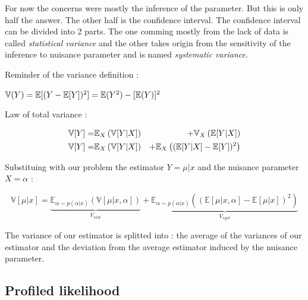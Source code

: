 For now the concerns were mostly the inference of the parameter.
But this is only half the answer.
The other half is the confidence interval.
The confidence interval can be divided into 2 parts.
The one comming mostly from the lack of data is called \emph{statistical variance} and the other takes origin from the sensitivity of the inference to nuisance parameter and is named \emph{systematic variance}.

Reminder of the variance definition :

$\mathbb{V}(Y) = \mathbb{E}[(Y - \mathbb{E}[Y])^2] = \mathbb{E}(Y^2) - [\mathbb{E}(Y)]^2$

Law of total variance \needcite :

\begin{eqnarray}
\label{eq:total_variance_law}
    \mathbb{V}[Y] =& \mathbb{E}_X \left (\mathbb{V}[Y|X] \right ) &+ \mathbb{V}_X \left (\mathbb{E}[Y|X]\right ) \\
    \mathbb{V}[Y] =& \mathbb{E}_X \left (\mathbb{V}[Y|X] \right ) &+ \mathbb{E}_X \left ( (\mathbb{E} [Y|X]  - \mathbb{E}[Y])^2\right )
\end{eqnarray}


Substituing with our problem the estimator $Y = \mu|x$ and the nuisance parameter $X = \alpha$ :

\begin{equation}
\label{eq:stat_and_syst_variance_definition}
\mathbb{V}[\mu|x] 
	= \underbrace{\mathbb{E}_{\alpha \sim p(\alpha|x)} \left (\mathbb{V}[\mu|x, \alpha] \right )}_{V_{stat}} 
	+ \underbrace{\mathbb{E}_{\alpha \sim p(\alpha|x)} \left ( (\mathbb{E} [\mu|x, \alpha]  - \mathbb{E}[\mu|x])^2\right )}_{V_{syst}}
\end{equation}

The variance of our estimator is splitted into :
the average of the variances of our estimator and the deviation from the average estimator induced by the nuisance parameter.







\subsection{Profiled likelihood} %
\label{sub:profiled_likelihood}




